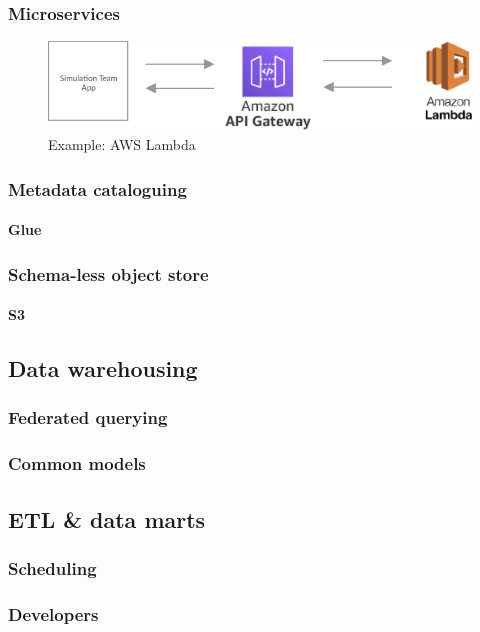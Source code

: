 \documentclass[10pt]{article}
\begin{document}
\subsubsection{Microservices}

\begin{figure}[h!]
	\centering
	\includegraphics[width=0.6\linewidth]{images/Lambda.png}
	\caption*{Example: AWS Lambda}	
\end{figure}

\subsubsection{Metadata cataloguing}
\paragraph{Glue}
\subsubsection{Schema-less object store}
\paragraph{S3}

\subsection{Data warehousing}
\subsubsection{Federated querying}
\subsubsection{Common models}

\subsection{ETL \& data marts}
\subsubsection{Scheduling}
\subsubsection{Developers}
\end{document}
